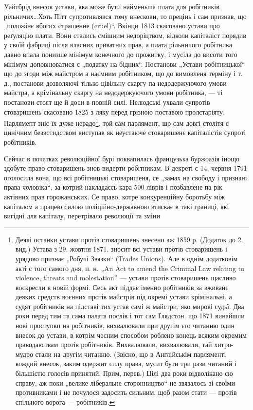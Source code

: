 Уайтбрід внесок устави, яка може бути найменьша плата
для робітників рільничих\dots Хоть Пітт супротивлявся тому
внескови, то прецінь і сам признав, що „положінє вбогих
страшенне (cruel)“. Вкінци 1813 скасовано устави про реґуляцію
плати. Вони стались смішним недоріцтвом, відколи
капіталіст порядив у своїй фабриці після власних приватних
прав, а плата рільничого робітника давно впала понизше
мінімум конечного до прожитку, і мусіла до висоти
того мінімум доповнюватися с „податку на бідних“. Постанови
„Устави робітницької“ що до згоди між майстром
а наємним робітником, що до вимовленя терміну і т. д.,
постанови дозволяючі тілько цівільну скаргу па недодержуючого
умови майстра, а крімінальну скаргу на недодержуючого
умови робітника, — ті постанови стоят ще й доси
в повній силі. Нелюдські ухвали супротів стоваришень
скасовано 1825 з ляку перед грізною поставою пролєтаріяту.
Парлямепт зніс їх дуже нерадо\footnote{
Деякі останки устави протів стоваришень знесено аж 1859 р.
(Додаток до 2. вид.) Устава з 29. жовтня 1871. зносит всі устави
протів стоваришень і урядово признає „Робучі Звязки“ (Trades Unions).
Але в однім додатковім акті с того самого дня, п. н. „An Act to amend
the Criminal Law relating to violence, threats and molestation” — устави
протів стоваришень щасливо воскресли в новій формі. Сесь акт піддає
іменно робітників за вживанє деяких средств воєнних протів майстрів
під окремі устави крімінальні, а судят робітників на підставі тих устав
самі ж майстри, яко мирові судьї. Два роки перед тим та сама палата
послів і тот сам Ґлядстон. що 1871 винайшли нові проступкп на робітників,
вихвалювали при другім єго читанню один внесок до устави, в котрім
чесним способом роблено конець всяким окремим праводавствам
протів робітників. Вихвалювали, вихвалювали, тай хитро-мудро стали на
другім читанню. (Звісно, що в Англійськім парляменті кождий внесок,
заким одержит силу права, мусит бути три рази читаний і більшістю голосів
принятий. Прим, перев.) Цілі два роки відволікано сю справу, аж
поки „велике ліберальне сторонництво“ не звязалось зі своїми противниками
і не почулося задосить сильним, щоб разом стати — протів спільного
ворога — робітників.
},  той сам парлямент, що
сам довгі столітя с цинічним безвстидством виступав як
неустаюче стоваришенє капіталістів супроті робітників.

Сейчас в початках революційної бурі поквапилась французька
буржоазія інощо здобуте право стоваришень знов
видерти робітникам. В декреті с 14. червня 1791 оголосила
вона, що всі робітницькі стоваришеня, се „замах на свободу
і признані права чоловіка“, за котрий накладаєсь кара
500 ліврів і позбавлене па рік актівних прав горожанських.
Се право, котре конкуренційну боротьбу між капіталом
а працею силою поліційно-державною втискає в такі границі,
які вигідні для капіталу, перетрівало революції та зміни